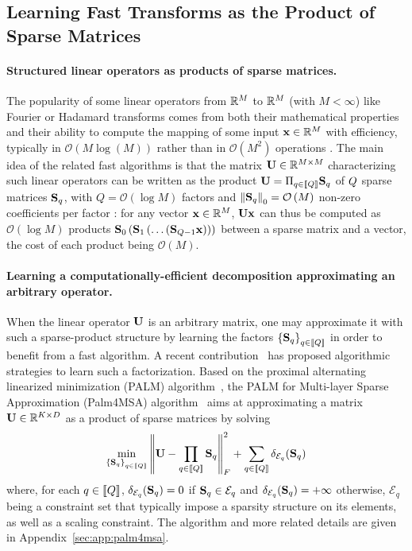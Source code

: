 \subsection{Learning Fast Transforms as the Product of Sparse Matrices}
\label{sec:palm4msa}

\paragraph{Structured linear operators as products of sparse matrices.}
The popularity of some linear operators from $\mathbb{R}^{M}$ to $\mathbb{R}^{M}$ (with $M<\infty$)
 like Fourier or Hadamard transforms comes from both their mathematical 
 properties and their ability to compute the mapping of some input ${\mathbf{x}}\in\mathbb{R}^M$ with efficiency, typically in $\mathcal{O}\left (M\log\left (M\right )\right )$ rather than 
 in $\mathcal{O}\left (M^2\right)$ operations .
The main idea of the related fast algorithms is that the matrix ${\mathbf{U}}\in{\mathbb{R}}^{M\times M}$ characterizing such linear operators can be written as the product ${\mathbf{U}}=\Pi_{q\in\left \llbracket Q\right \rrbracket}{\mathbf{S}}_q$ of $Q$ sparse matrices ${\mathbf{S}}_q$, with $Q=\mathcal{O}\left (\log M\right )$ factors and $\left \|{\mathbf{S}}_q\right \|_0=\mathcal{O}\left (M\right )$ non-zero coefficients per factor \cite{LeMagoarou2016Flexible,Morgenstern1975Linear}:
for any vector ${\mathbf{x}}\in{\mathbb{R}}^M$, ${\mathbf{U}}{\mathbf{x}}$ can thus be computed as $\mathcal{O}\left (\log M\right )$ products ${\mathbf{S}}_0 \left ({\mathbf{S}}_1 \left (\ldots \left ({\mathbf{S}}_{Q-1}{\mathbf{x}}\right )\right )\right )$ between a sparse matrix and a vector, the cost of each product being $\mathcal{O}\left (M\right )$.

\paragraph{Learning a computationally-efficient decomposition approximating an arbitrary operator.} When the linear operator ${\mathbf{U}}$ is an arbitrary matrix, one may approximate it with such a sparse-product structure by learning the factors $\left \lbrace{\mathbf{S}}_q\right \rbrace_{q\in\left \llbracket Q\right \rrbracket}$ in order to benefit from a fast algorithm.
A recent contribution~\cite{LeMagoarou2016Flexible} has proposed algorithmic strategies to learn such a factorization. Based on the proximal alternating linearized minimization (PALM) algorithm~\cite{bolte2014proximal}, the PALM for Multi-layer Sparse Approximation (Palm4MSA) algorithm~\cite{LeMagoarou2016Flexible} aims at approximating a matrix ${\mathbf{U}}\in{\mathbb{R}}^{K\times D}$ as a product of sparse matrices by solving
\begin{align}
\label{eq:palm4msa}
\min_{\left \lbrace{\mathbf{S}}_q\right \rbrace_{q\in\left \llbracket Q\right \rrbracket}} \left \|{\mathbf{U}} -  \prod_{q\in\left \llbracket Q\right \rrbracket}{{\mathbf{S}}_q}\right \|_F^2 + \sum_{q\in\left \llbracket Q\right \rrbracket} \delta_{\mathcal{E}_q}({\mathbf{S}}_q)
\end{align}
where, for each $q\in\left \llbracket Q\right \rrbracket$, $\delta_{\mathcal{E}_q}({\mathbf{S}}_q)=0$ 
if ${\mathbf{S}}_q \in \mathcal{E}_q$ and $\delta_{\mathcal{E}_q}({\mathbf{S}}_q)=+\infty$ otherwise, $\mathcal{E}_q$ being a constraint set that typically impose a sparsity structure on its elements, as well as a scaling constraint. The \palm algorithm and more related details are given in Appendix~\ref{sec:app:palm4msa}.

